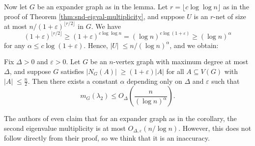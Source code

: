 Now let $G$ be an expander graph as in the lemma.
Let $r = \lfloor c \log \log n \rfloor$ as in the proof of Theorem \ref{thm:snd-eigval-multiplicity},
and suppose $U$ is an $r$-net of size at most $n / (1 + \varepsilon)^{\lfloor r / 2 \rfloor}$ in $G$. 
We have 
\begin{equation*}
    (1 + \varepsilon)^{\lfloor r / 2 \rfloor} \ge (1 + \varepsilon)^{ c \log \log n} = (\log n)^{c \log (1 + \varepsilon)} \ge (\log n)^\alpha
\end{equation*}
for any $\alpha \le c \log (1 + \varepsilon)$.
Hence, $|U|\; \le n / (\log n)^\alpha$, 
and we obtain:

\begin{corollary}
    Fix $\Delta > 0$ and $\varepsilon > 0$.
    Let $G$ be an $n$-vertex graph with maximum degree at most $\Delta$, and suppose $G$ satisfies $|N_G(A)|\; \ge (1 + \varepsilon) |A|$ for all $A \subseteq V(G)$ with $|A|\; \le \frac{n}{2}$.
    Then there exists a constant $\alpha$ depending only on $\Delta$ and $\varepsilon$ such that
    \begin{equation*}
        m_G (\lambda_2) \le O_{\Delta} \left(\frac{n}{(\log n)^\alpha} \right).
    \end{equation*}
\end{corollary}

\begin{remark}
    The authors of \cite{equiangular} even claim that for an expander graph as in the corollary, the second eigenvalue multiplicity is at most $O_{\Delta, \varepsilon}(n / \log n)$. 
    However, this does not follow directly from their proof, so we think that it is an inaccuracy.
\end{remark}

